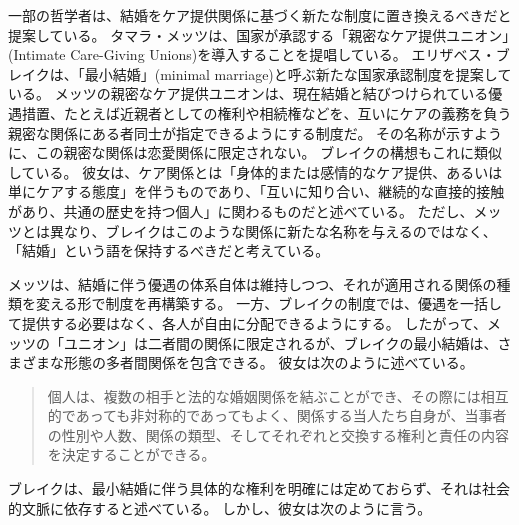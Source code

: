 \documentclass[paper=a4,book,openany]{jlreq}
\begin{document}
一部の哲学者は、結婚をケア提供関係に基づく新たな制度に置き換えるべきだと提案している。
タマラ・メッツは、国家が承認する「親密なケア提供ユニオン」(Intimate Care-Giving Unions)を導入することを提唱している。
エリザベス・ブレイクは、「最小結婚」(minimal marriage)と呼ぶ新たな国家承認制度を提案している\citep{metz10:_untyin_knot,brake12:_minim_marriag}。
メッツの親密なケア提供ユニオンは、現在結婚と結びつけられている優遇措置、たとえば近親者としての権利や相続権などを、互いにケアの義務を負う親密な関係にある者同士が指定できるようにする制度だ。
その名称が示すように、この親密な関係は恋愛関係に限定されない。
ブレイクの構想もこれに類似している。
彼女は、ケア関係とは「身体的または感情的なケア提供、あるいは単にケアする態度」を伴うものであり、「互いに知り合い、継続的な直接的接触があり、共通の歴史を持つ個人」に関わるものだと述べている\citep[p.106]{brake12:_minim_marriag}。
ただし、メッツとは異なり、ブレイクはこのような関係に新たな名称を与えるのではなく、「結婚」という語を保持するべきだと考えている。

メッツは、結婚に伴う優遇の体系自体は維持しつつ、それが適用される関係の種類を変える形で制度を再構築する。
一方、ブレイクの制度では、優遇を一括して提供する必要はなく、各人が自由に分配できるようにする。
したがって、メッツの「ユニオン」は二者間の関係に限定されるが、ブレイクの最小結婚は、さまざまな形態の多者間関係を包含できる。
彼女は次のように述べている。

\begin{quote}
個人は、複数の相手と法的な婚姻関係を結ぶことができ、その際には相互的であっても非対称的であってもよく、関係する当人たち自身が、当事者の性別や人数、関係の類型、そしてそれぞれと交換する権利と責任の内容を決定することができる。
\citep[p.157]{brake12:_minim_marriag}
\end{quote}

ブレイクは、最小結婚に伴う具体的な権利を明確には定めておらず、それは社会的文脈に依存すると述べている。
しかし、彼女は次のように言う。
\end{document}
